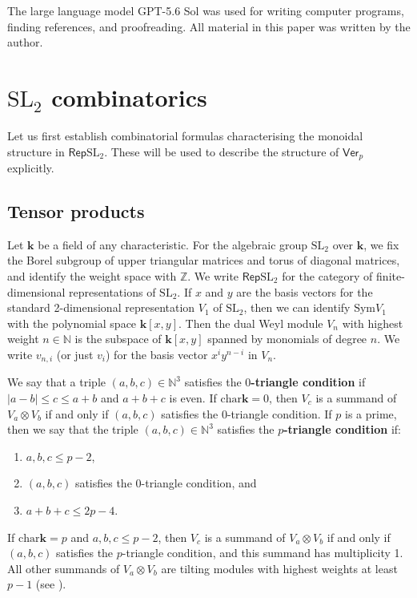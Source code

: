 \documentclass[11pt,a4paper,reqno]{amsart}
\theoremstyle{definition}
\newcommand{\bk}{\mathbf{k}}
\numberwithin{equation}{section}
\newcommand{\charr}{\mathrm{char}}
\newcommand{\Ver}{\mathsf{Ver}}
\newcommand{\Rep}{\mathsf{Rep}}
\newcommand{\mN}{\mathbb{N}}
\newcommand{\mZ}{\mathbb{Z}}
\newcommand{\Sym}{\mathrm{Sym}}
\newcommand{\SL}{\mathrm{SL}}
\begin{document}
The large language model GPT-5.6 Sol was used for writing computer programs, finding references, and proofreading. All material in this paper was written by the author. 

\section{$\SL_2$ combinatorics}\label{SecPrelim}

Let us first establish combinatorial formulas characterising the monoidal structure in $\Rep\SL_2$. These will be used to describe the structure of $\Ver_p$ explicitly.

\subsection{Tensor products}\label{SecInclProj} Let $\bk$ be a field of any characteristic. For the algebraic group $\SL_2$ over $\bk$, we fix the Borel subgroup of upper triangular matrices and torus of diagonal matrices, and identify the weight space with $\mZ$. We write $\Rep\SL_2$ for the category of finite-dimensional representations of $\SL_2$. If $x$ and $y$ are the basis vectors for the standard 2-dimensional representation $V_1$ of $\SL_2$, then we can identify $\Sym V_1$ with the polynomial space $\bk[x,y]$. Then the dual Weyl module $V_n$ with highest weight $n\in\mN$ is the subspace of $\bk[x,y]$ spanned by monomials of degree $n$. We write $v_{n,i}$ (or just $v_i$) for the basis vector $x^iy^{n-i}$ in $V_n$.

We say that a triple $(a,b,c)\in\mN^3$ satisfies the \textbf{$0$-triangle condition} if $|a-b|\leq c\leq a+b$ and $a+b+c$ is even. If $\charr\bk=0$, then $V_c$ is a summand of $V_a\otimes V_b$ if and only if $(a,b,c)$ satisfies the $0$-triangle condition. If $p$ is a prime, then we say that the triple $(a,b,c)\in\mN^3$ satisfies the \textbf{$p$-triangle condition} if:
\begin{enumerate}
\item $a,b,c\leq p-2$,
\item $(a,b,c)$ satisfies the 0-triangle condition, and
\item $a+b+c\leq 2p-4$.
\end{enumerate}
If $\charr\bk=p$ and $a,b,c\leq p-2$, then $V_c$ is a summand of $V_a\otimes V_b$ if and only if $(a,b,c)$ satisfies the $p$-triangle condition, and this summand has multiplicity 1. All other summands of $V_a\otimes V_b$ are tilting modules with highest weights at least $p-1$ (see \cite[Lemma~1.3]{DH}).
\end{document}
